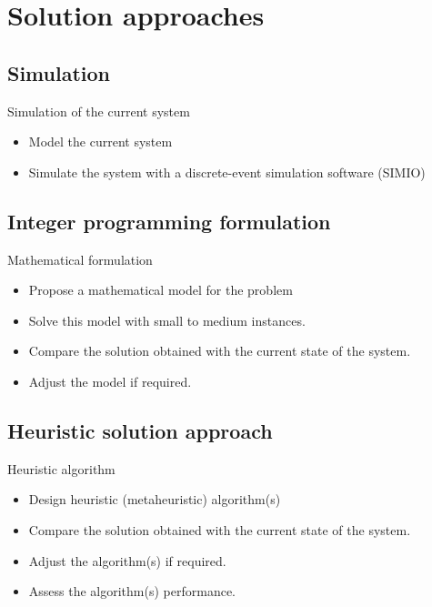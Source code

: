 \documentclass[9pt,xcolor={dvipsnames}]{beamer}
\begin{document}
\section{Solution approaches}

\subsection{Simulation}
\begin{frame}{Simulation of the current system}

\begin{block}{}
\begin{itemize}
\item Model the current system
\item Simulate the system with a discrete-event simulation software (SIMIO)
\end{itemize}
\end{block}
\end{frame}


\subsection{Integer programming formulation}

\begin{frame}{Mathematical formulation}

\begin{block}{}
\begin{itemize}
\item Propose a mathematical model for the problem
\item Solve this model with small to medium instances. 
\item Compare the solution obtained with the current state of the system.
\item Adjust the model if required.
\end{itemize}
\end{block}
\end{frame}

\subsection{Heuristic solution approach}

\begin{frame}{Heuristic algorithm}

\begin{block}{}
\begin{itemize}
\item Design heuristic (metaheuristic) algorithm(s)
\item Compare the solution obtained with the current state of the system.
\item Adjust the algorithm(s) if required.
\item Assess the algorithm(s) performance.
\end{itemize}
\end{block}
\end{frame}
\end{document}
